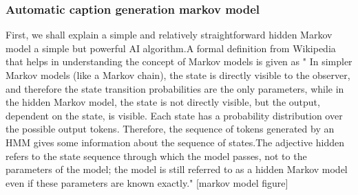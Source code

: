 \documentclass[sigconf]{acmart}
\begin{document}
\subsubsection{Automatic caption generation markov model}
First, we shall explain a simple and relatively straightforward hidden Markov model a simple but powerful AI algorithm.A formal definition from Wikipedia that helps in understanding the concept of Markov models is given as " In simpler Markov models (like a Markov chain), the state is directly visible to the observer, and therefore the state transition probabilities are the only parameters, while in the hidden Markov model, the state is not directly visible, but the output, dependent on the state, is visible. Each state has a probability distribution over the possible output tokens. Therefore, the sequence of tokens generated by an HMM gives some information about the sequence of states.The adjective hidden refers to the state sequence through which the model passes, not to the parameters of the model; the model is still referred to as a hidden Markov model even if these parameters are known exactly." [markov model figure]
\newline
\end{document}

